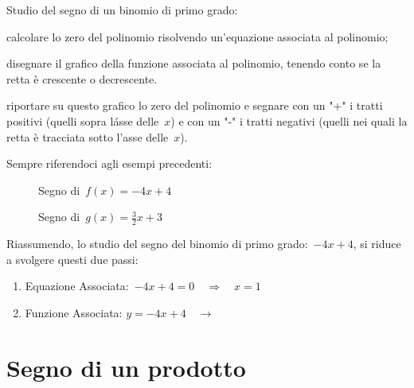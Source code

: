 \begin{procedura}
 Studio del segno di un binomio di primo grado:
\begin{enumeratea}
\item calcolare lo zero del polinomio risolvendo un'equazione associata al 
 polinomio;
\item disegnare il grafico della funzione associata al polinomio, 
 tenendo conto se la retta è crescente o decrescente.
\item riportare su questo grafico lo zero del polinomio e segnare con un 
 "+" i tratti positivi (quelli sopra l\'asse delle~$x$) e con un "-" i tratti 
 negativi (quelli nei quali la retta è tracciata sotto l'asse delle~$x$).
\end{enumeratea}
\end{procedura}

Sempre riferendoci agli esempi precedenti:

\begin{inaccessibleblock}
 \begin{figure}[h]
 \centering
 \begin{minipage}[]{.45\textwidth}
  \centering
  \caption{Segno di~$f(x) = -4 x +4$}
 \end{minipage}
 \begin{minipage}[]{.45\textwidth}
  \centering
  \caption{Segno di~$g(x) = \frac{3}{2} x +3$}
 \end{minipage}
\end{figure}
\end{inaccessibleblock}

Riassumendo, lo studio del segno del binomio di primo grado:~$-4 x +4$,  
si riduce a svolgere questi due passi:

\begin{enumerate}
 \item
  Equazione Associata:~$-4 x +4 = 0 \quad \Rightarrow \quad x = 1$
 \item 
  \begin{minipage}{.45\textwidth}
  Funzione Associata: $y = -4 x +4 \quad \rightarrow$
  \end{minipage}
  \begin{minipage}{.30\textwidth}
  
  \end{minipage}
\end{enumerate}

\section{Segno di un prodotto}
\label{sec:dis_prodotto}

